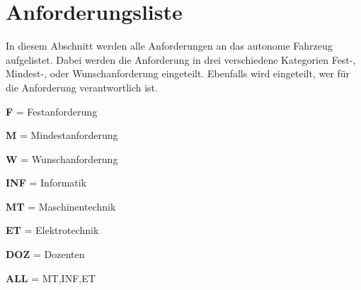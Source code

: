 \documentclass[../main.tex]{subfiles}
\begin{document}
\newpage
\section{Anforderungsliste}
\label{sec:anforderungsliste}

In diesem Abschnitt werden alle Anforderungen an das autonome Fahrzeug aufgelistet.
Dabei werden die Anforderung in drei verschiedene Kategorien Fest-, Mindest-, oder Wunschanforderung eingeteilt.
Ebenfalls wird eingeteilt, wer für die Anforderung verantwortlich ist.

\begin{multicols}{2}
\begin{items}
  \item {\bf F} = Festanforderung
  \item {\bf M} = Mindestanforderung
  \item {\bf W} = Wunschanforderung
\end{items}

\columnbreak

\begin{items}
  \item {\bf INF} = Informatik
  \item {\bf MT} = Maschinentechnik
  \item {\bf ET} = Elektrotechnik
  \item {\bf DOZ} = Dozenten
  \item {\bf ALL} = MT,INF,ET
\end{items}
\end{multicols}
\end{document}
